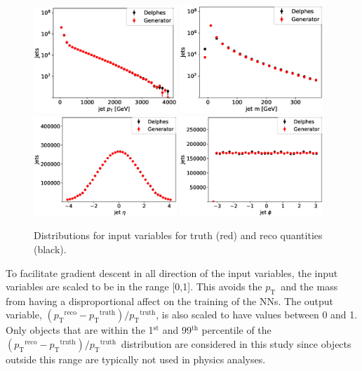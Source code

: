 \documentclass[showpacs,showkeys,preprint,prd,nofootinbib,linenumbers,12pt,superscriptaddress]{revtex4-1}
\def\pt{\ensuremath{p_{\mathrm{T}}}}
\def\ptRes{\ensuremath{(\pt^{\mathrm{reco}}-\pt^{\mathrm{truth}})/\pt^{\mathrm{truth}}}}
\begin{document}
\begin{figure}[h]
  \includegraphics[width=0.48\textwidth]{figures/nn/jet_pT_prescaling_log.eps}
  \includegraphics[width=0.48\textwidth]{figures/nn/jet_m_prescaling_log.eps}\\
  \includegraphics[width=0.48\textwidth]{figures/nn/jet_eta_prescaling.eps}
  \includegraphics[width=0.48\textwidth]{figures/nn/jet_phi_prescaling.eps}
  \caption{Distributions for input variables for truth (red) and reco quantities (black).}
  \label{fig:nnInputsPrescaling}
\end{figure}

To facilitate gradient descent in all direction of the input variables, the input variables are scaled to be in the range [0,1]. This avoids the \pt\ and the mass from having a disproportional affect on the training of the NNs. The output variable, \ptRes, is also scaled to have values between 0 and 1. Only objects that 
are within the 1$^{\mathrm{st}}$ and 99$^{\mathrm{th}}$ percentile of the \ptRes\ distribution are considered in this study since objects outside this range are typically not used in physics analyses.
\end{document}
